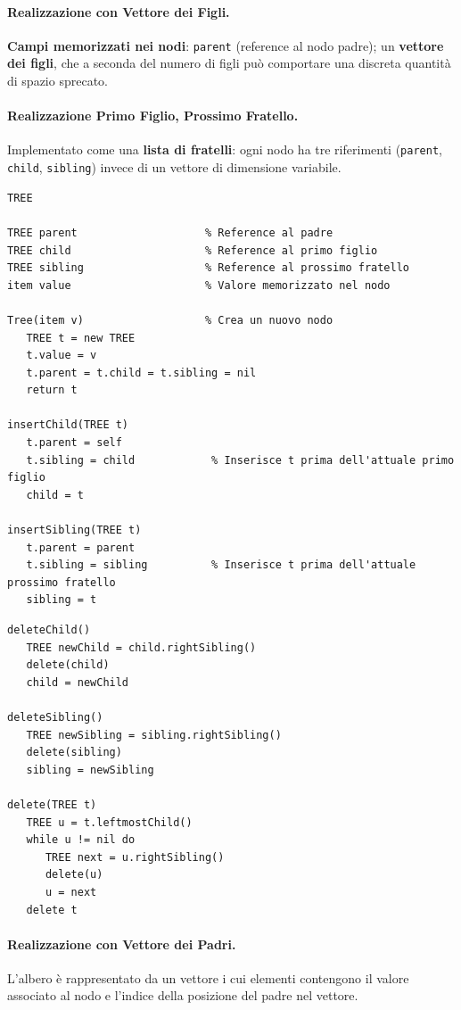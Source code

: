 \documentclass[12pt, a4paper]{article}
\begin{document}
\paragraph{Realizzazione con Vettore dei Figli.}
\textbf{Campi memorizzati nei nodi}: \texttt{parent} (reference al nodo padre); un \textbf{vettore dei figli}, che a seconda del numero di figli può comportare una discreta quantità di spazio sprecato.

\paragraph{Realizzazione Primo Figlio, Prossimo Fratello.}
Implementato come una \textbf{lista di fratelli}: ogni nodo ha tre riferimenti (\texttt{parent}, \texttt{child}, \texttt{sibling}) invece di un vettore di dimensione variabile.

\begin{verbatim}
TREE

TREE parent                    % Reference al padre
TREE child                     % Reference al primo figlio
TREE sibling                   % Reference al prossimo fratello
item value                     % Valore memorizzato nel nodo

Tree(item v)                   % Crea un nuovo nodo
   TREE t = new TREE
   t.value = v
   t.parent = t.child = t.sibling = nil
   return t

insertChild(TREE t)
   t.parent = self
   t.sibling = child            % Inserisce t prima dell'attuale primo figlio
   child = t

insertSibling(TREE t)
   t.parent = parent
   t.sibling = sibling          % Inserisce t prima dell'attuale prossimo fratello
   sibling = t
\end{verbatim}

\begin{verbatim}
deleteChild()
   TREE newChild = child.rightSibling()
   delete(child)
   child = newChild

deleteSibling()
   TREE newSibling = sibling.rightSibling()
   delete(sibling)
   sibling = newSibling

delete(TREE t)
   TREE u = t.leftmostChild()
   while u != nil do
      TREE next = u.rightSibling()
      delete(u)
      u = next
   delete t
\end{verbatim}

\paragraph{Realizzazione con Vettore dei Padri.}
L'albero è rappresentato da un vettore i cui elementi contengono il valore associato al nodo e l'indice della posizione del padre nel vettore.
\end{document}
